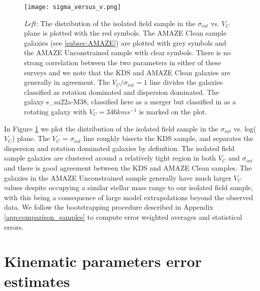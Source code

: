\documentclass[fleqn,usenatbib]{mn2e}
\begin{document}
\begin{figure}
\centering \hspace{-1.13cm}
\texttt{[image: sigma\_versus\_v.png]}
\caption{{\it Left:} The distribution of the isolated field sample in the $\sigma_{int}$ vs. $V_{C}$ plane is plotted with the red symbols.
The AMAZE Clean sample galaxies (see \protect\cref{subsec:AMAZE}) are plotted with grey symbols and the AMAZE Unconstrained sample with clear symbols.    There is no strong correlation between the two parameters in either of these surveys and we note that the KDS and AMAZE Clean galaxies are generally in agreement.
The $V_{C}/\sigma_{int} = 1$ line divides the galaxies classified as rotation dominated and dispersion dominated.
The galaxy s\_sa22a-M38, classified here as a merger but classified in \protect\cite{Gnerucci2011} as a rotating galaxy with $V_{C} = 346kms^{-1}$ is marked on the plot.}
\label{fig:intrinsic_parameters}
\end{figure}

In Figure \ref{fig:intrinsic_parameters} we plot the distribution of the isolated field sample in the $\sigma_{int}$ vs. log($V_{C}$) plane. 
The $V_{C}$ = $\sigma_{int}$ line roughly bisects the KDS sample, and separates the dispersion and rotation dominated galaxies by definition.
The isolated field sample galaxies are clustered around a relatively tight region in both $V_{C}$ and $\sigma_{int}$ and there is good agreement between the KDS and AMAZE Clean samples.
The galaxies in the AMAZE Unconstrained sample generally have much larger $V_{C}$ values despite occupying a similar stellar mass range to our isolated field sample, with this being a consequence of large model extrapolations beyond the observed data.
We follow the bootstrapping procedure described in Appendix \ref{app:comparison_samples} to compute error weighted averages and statistical errors.

\section{Kinematic parameters error estimates}\label{app:kin_error_estimates}
\end{document}
